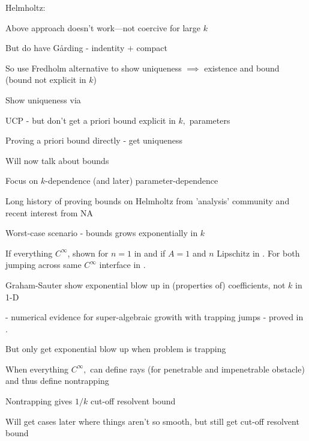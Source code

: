 Helmholtz:
\bit
\item Above approach doesn't work---not coercive for large $k$
\item But do have G\r{a}rding - indentity $+$ compact
\item So use Fredholm alternative to show uniqueness $\implies$ existence and bound (bound not explicit in $k$)
\item Show uniqueness via
\bit
\item UCP - but don't get a priori bound explicit in $k,$ parameters
\item Proving a priori bound directly - get uniqueness
\eit
\eit
\bit
\item Will now talk about bounds
\item Focus on $k$-dependence (and later) parameter-dependence
\item Long history of proving bounds on Helmholtz from 'analysis' community \cite{Bl:73,Va:75,BlKa:77,Bu:98,PeVe:99,PoVo:99a,PoVo:99b,CaPoVo:99,Bu:02,Be:03,Ca:12,CaLePa:12,NgVo:12,Sh:18} and recent interest from NA \cite{Me:95,CuFe:06,He:07,EsMe:12,Sp:14,FeLiLo:15,Ch:15,BaSpWu:16,BrGaPe:17,BaChGo:17,SaTo:18,OhVe:18,GrSa:18,GaSpWu:18,GrPeSp:19,MoSp:19}
\item Worst-case scenario - bounds grows exponentially in $k$
\bit
\item If everything $C^\infty$, shown for $n=1$ in \cite{Bu:02} and if $A=1$ and $n$ Lipschitz in \cite{Sh:18}. For both jumping across same $C^\infty$ interface in \cite{Bu:98}.
\item Graham-Sauter \cite{GrSa:18} show exponential blow up in (properties of) coefficients, not $k$ in 1-D
\item \cite{MoSp:19} - numerical evidence for super-algebraic growith with trapping jumps - proved in \cite{PoVo:99a,PoVo:99b,CaPoVo:99}.
\eit
\item But only get exponential blow up when problem is trapping
\item When everything $C^\infty,$ can define rays (for penetrable and impenetrable obstacle) and thus define nontrapping
\item Nontrapping gives $1/k$ cut-off resolvent bound
\item Will get cases later where things aren't so smooth, but still get cut-off resolvent bound
